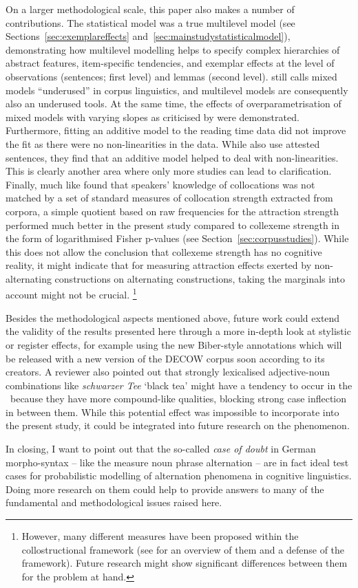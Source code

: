 On a larger methodological scale, this paper also makes a number of contributions.
The statistical model was a true multilevel model (see Sections~\ref{sec:exemplareffects} and~\ref{sec:mainstudystatisticalmodel}), demonstrating how multilevel modelling helps to specify complex hierarchies of abstract features, item-specific tendencies, and exemplar effects at the level of observations (sentences; first level) and lemmas (second level).
\cite{Gries2015} still calls mixed models ``underused'' in corpus linguistics, and multilevel models are consequently also an underused tools.
At the same time, the effects of overparametrisation of mixed models with varying slopes as criticised by \cite{BatesEa2015a} were demonstrated.
Furthermore, fitting an additive model to the reading time data did not improve the fit as there were no non-linearities in the data.
While \cite{DivjakEa2016} also use attested sentences, they find that an additive model helped to deal with non-linearities.
This is clearly another area where only more studies can lead to clarification.
Finally, much like \cite{Dabrowska2014} found that speakers' knowledge of collocations was not matched by a set of standard measures of collocation strength extracted from corpora, a simple quotient based on raw frequencies for the attraction strength performed much better in the present study compared to collexeme strength in the form of logarithmised Fisher p-values (see Section~\ref{sec:corpusstudies}).
While this does not allow the conclusion that collexeme strength has no cognitive reality, it might indicate that for measuring attraction effects exerted by non-alternating constructions on alternating constructions, taking the marginals into account might not be crucial.%
\footnote{However, many different measures have been proposed within the collostructional framework (see \citealp{Gries2015b} for an overview of them and a defense of the framework).
Future research might show significant differences between them for the problem at hand.}

Besides the methodological aspects mentioned above, future work could extend the validity of the results presented here through a more in-depth look at stylistic or register effects, for example using the new Biber-style annotations \citep{Biber1988} which will be released with a new version of the DECOW corpus soon according to its creators.
A reviewer also pointed out that strongly lexicalised adjective-noun combinations like \textit{schwarzer Tee} `black tea' might have a tendency to occur in the \NACa\ because they have more compound-like qualities, blocking strong case inflection in between them.
While this potential effect was impossible to incorporate into the present study, it could be integrated into future research on the phenomenon.

In closing, I want to point out that the so-called \textit{case of doubt} in German morpho-syntax -- like the measure noun phrase alternation -- are in fact ideal test cases for probabilistic modelling of alternation phenomena in cognitive linguistics.
Doing more research on them could help to provide answers to many of the fundamental and methodological issues raised here.
